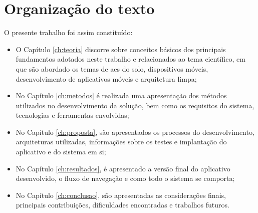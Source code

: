 \section{Organização do texto}

O presente trabalho foi assim constituído:
\begin{itemize}
    \item O Capítulo \ref{ch:teoria} discorre sobre conceitos básicos dos principais fundamentos adotados neste trabalho e relacionados ao tema científico, em que são abordado os temas de \acp{ae} do solo, dispositivos móveis, desenvolvimento de aplicativos móveis e arquitetura limpa;
    \item No Capítulo \ref{ch:metodos} é realizada uma apresentação dos métodos utilizados no desenvolvimento da solução, bem como os requisitos do sistema, tecnologias e ferramentas envolvidas;
    \item No Capítulo \ref{ch:proposta}, são apresentados os processos do desenvolvimento, arquiteturas utilizadas, informações sobre os testes e implantação do aplicativo e do sistema em si;
    \item No Capítulo \ref{ch:resultados}, é apresentado a versão final do aplicativo desenvolvido, o fluxo de navegação e como todo o sistema se comporta;
    \item No Capítulo \ref{ch:conclusao}, são apresentadas as considerações finais, principais contribuições, dificuldades encontradas e trabalhos futuros.
\end{itemize}
